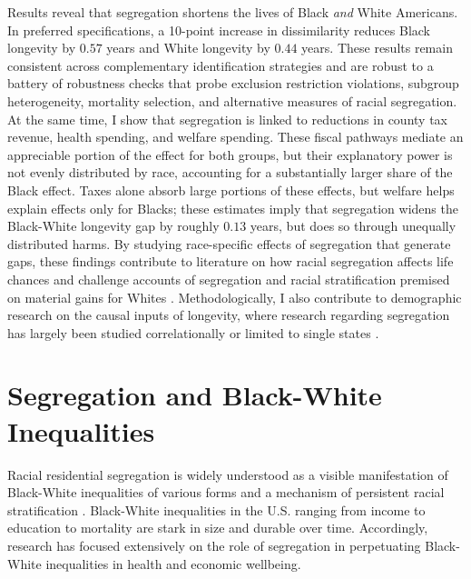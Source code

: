 \documentclass[11pt]{article}
\begin{document}
Results reveal that segregation shortens the lives of Black \textit{and} White Americans. In preferred specifications, a 10-point increase in dissimilarity reduces Black longevity by $0.57$ years and White longevity by $0.44$ years. These results remain consistent across complementary identification strategies and are robust to a battery of robustness checks that probe exclusion restriction violations, subgroup heterogeneity, mortality selection, and alternative measures of racial segregation. At the same time, I show that segregation is linked to reductions in county tax revenue, health spending, and welfare spending. These fiscal pathways mediate an appreciable portion of the effect for both groups, but their explanatory power is not evenly distributed by race, accounting for a substantially larger share of the Black effect. Taxes alone absorb large portions of these effects, but welfare helps explain effects only for Blacks; these estimates imply that segregation widens the Black-White longevity gap by roughly $0.13$ years, but does so through unequally distributed harms. By studying race-specific effects of segregation that generate gaps, these findings contribute to literature on how racial segregation affects life chances \citep{massey_american_1990,massey_effect_1987,hendi_estimation_2023} and challenge accounts of segregation and racial stratification premised on material gains for Whites \citep{massey_getting_1995,blalock_1967}. Methodologically, I also contribute to demographic research on the causal inputs of longevity, where research regarding segregation has largely been studied correlationally or limited to single states \citep{logan_segregation_2018,karbeah_racial_2023}. 
\section{Segregation and Black-White Inequalities}

Racial residential segregation is widely understood as a visible manifestation of Black-White inequalities of various forms \citep{blokland_outside_2008} and a mechanism of persistent racial stratification \citep{massey_effect_1987}. Black-White inequalities in the U.S. ranging from income to education to mortality are stark in size and durable over time. Accordingly, research has focused extensively on the role of segregation in perpetuating Black-White inequalities in health and economic wellbeing.
\end{document}
